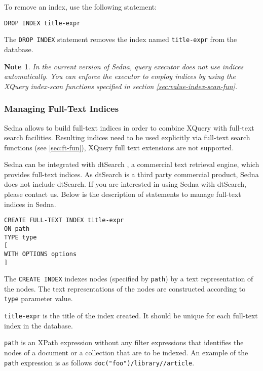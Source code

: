\documentclass[a4paper,12pt]{article}
\newtheorem{note}{Note}    %
\begin{document}
To remove an index, use the following statement:
\begin{verbatim}
DROP INDEX title-expr
\end{verbatim}

The \verb!DROP INDEX! statement removes the index named \verb!title-expr! from
the database.

\begin{note} In the current version of Sedna, query executor does not use
indices automatically. You can enforce the executor to employ indices by using
the XQuery index-scan functions specified in section
\ref{sec:value-index-scan-fun}.
\end{note}


\subsubsection{Managing Full-Text Indices}
\label{sec:managing-ft-indices}
Sedna allows to build full-text indices in order to combine XQuery with
full-text search facilities. Resulting indices need to be used explicitly via
full-text search functions (see \ref{sec:ft-fun}), XQuery full text extensions
are not supported.

Sedna can be integrated with dtSearch \cite{link:dtsearch-engine}, a commercial
text retrieval engine, which provides full-text indices. As dtSearch is a third
party commercial product, Sedna does not include dtSearch. If you are interested
in using Sedna with dtSearch, please contact us. Below is the description of
statements to manage full-text indices in Sedna.

\begin{verbatim}
CREATE FULL-TEXT INDEX title-expr
ON path
TYPE type
[
WITH OPTIONS options
]
\end{verbatim}

The \verb!CREATE INDEX! indexes nodes (specified by \verb!path!) by a text
representation of the nodes. The text representations of the nodes are
constructed according to \verb!type! parameter value.

\verb!title-expr! is the title of the index created. It should be unique for
each full-text index in the database.

\verb!path! is an XPath expression without any filter expressions that
identifies the nodes of a document or a collection that are to be indexed. An
example of the \verb!path! expression is as follows
\verb!doc("foo")/library//article!.
\end{document}
